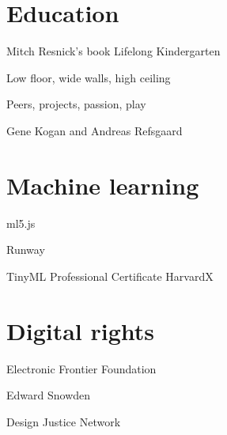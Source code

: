 \section{Education}

Mitch Resnick's book Lifelong Kindergarten

Low floor, wide walls, high ceiling

Peers, projects, passion, play

Gene Kogan and Andreas Refsgaard

\section{Machine learning}

ml5.js

Runway

TinyML Professional Certificate HarvardX

\section{Digital rights}

Electronic Frontier Foundation

Edward Snowden

Design Justice Network